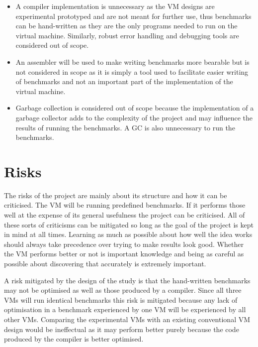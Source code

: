 \documentclass[english,a4paper]{report}
\begin{document}
\begin{itemize}
	\item A compiler implementation is unnecessary as the VM designs are experimental prototyped and are not meant for further use, thus benchmarks can be hand-written as they are the only programs needed to run on the virtual machine. Similarly, robust error handling and debugging tools are considered out of scope. 
	
	\item An assembler will be used to make writing benchmarks more bearable but is not considered in scope as it is simply a tool used to facilitate easier writing of benchmarks and not an important part of the implementation of the virtual machine.
	
	\item Garbage collection is considered out of scope because the implementation of a garbage collector adds to the complexity of the project and may influence the results of running the benchmarks. A GC is also unnecessary to run the benchmarks.
\end{itemize}



\section{Risks}
The risks of the project are mainly about its structure and how it can
be criticised. The VM will be running predefined benchmarks. If it
performs those well at the expense of its general usefulness the
project can be criticised. All of these sorts of criticisms can be
mitigated so long as the goal of the project is kept in mind at all
times. Learning as much as possible about how well the idea works
should always take precedence over trying to make results look
good. Whether the VM performs better or not is important knowledge and
being as careful as possible about discovering that accurately is
extremely important.

A risk mitigated by the design of the study is that the hand-written benchmarks may not be optimised as well as those produced by a compiler. Since all three VMs will run identical benchmarks this risk is mitigated because any lack of optimisation in a benchmark experienced by one VM will be experienced by all other VMs. Comparing the experimental VMs with an existing conventional VM design would be ineffectual as it may perform better purely because the code produced by the compiler is better optimised.
\end{document}
